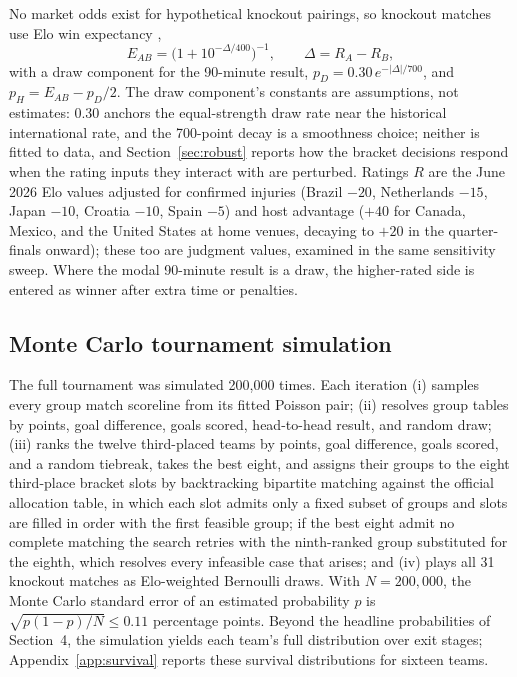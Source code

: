\documentclass[11pt,letterpaper]{article}
\begin{document}
No market odds exist for hypothetical knockout pairings, so knockout matches use Elo win expectancy \citep{elo1978, hvattum2010},
\begin{equation}
E_{AB} = \bigl(1 + 10^{-\Delta/400}\bigr)^{-1}, \qquad \Delta = R_A - R_B,
\end{equation}
with a draw component for the 90-minute result, $p_D = 0.30\, e^{-|\Delta|/700}$, and $p_H = E_{AB} - p_D/2$. The draw component's constants are assumptions, not estimates: 0.30 anchors the equal-strength draw rate near the historical international rate, and the 700-point decay is a smoothness choice; neither is fitted to data, and Section~\ref{sec:robust} reports how the bracket decisions respond when the rating inputs they interact with are perturbed. Ratings $R$ are the June 2026 Elo values adjusted for confirmed injuries (Brazil $-20$, Netherlands $-15$, Japan $-10$, Croatia $-10$, Spain $-5$) and host advantage ($+40$ for Canada, Mexico, and the United States at home venues, decaying to $+20$ in the quarter-finals onward); these too are judgment values, examined in the same sensitivity sweep. Where the modal 90-minute result is a draw, the higher-rated side is entered as winner after extra time or penalties.

\subsection{Monte Carlo tournament simulation}

The full tournament was simulated 200{,}000 times. Each iteration (i) samples every group match scoreline from its fitted Poisson pair; (ii) resolves group tables by points, goal difference, goals scored, head-to-head result, and random draw; (iii) ranks the twelve third-placed teams by points, goal difference, goals scored, and a random tiebreak, takes the best eight, and assigns their groups to the eight third-place bracket slots by backtracking bipartite matching against the official allocation table, in which each slot admits only a fixed subset of groups and slots are filled in order with the first feasible group; if the best eight admit no complete matching the search retries with the ninth-ranked group substituted for the eighth, which resolves every infeasible case that arises; and (iv) plays all 31 knockout matches as Elo-weighted Bernoulli draws. With $N = 200{,}000$, the Monte Carlo standard error of an estimated probability $p$ is $\sqrt{p(1-p)/N} \le 0.11$ percentage points. Beyond the headline probabilities of Section~4, the simulation yields each team's full distribution over exit stages; Appendix~\ref{app:survival} reports these survival distributions for sixteen teams.
\end{document}
